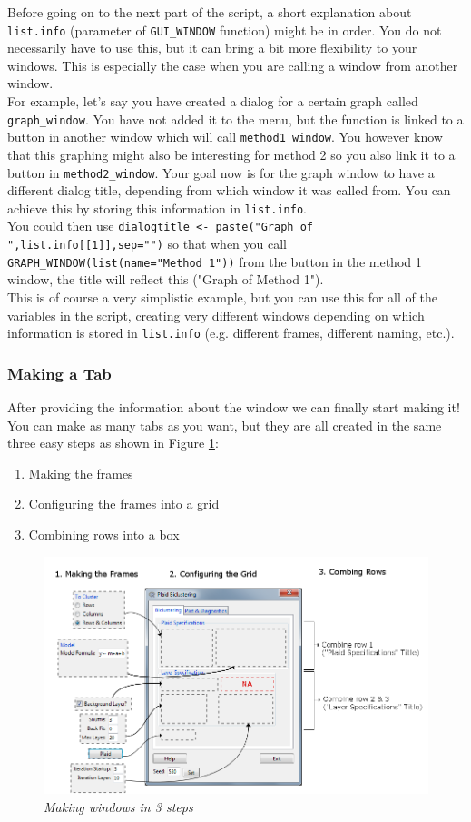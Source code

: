 \documentclass[a4paper]{article}\usepackage[]{graphicx}\usepackage[]{color}
\begin{document}
\noindent Before going on to the next part of the script, a short explanation
about \verb|list.info| (parameter of \verb|GUI_WINDOW| function) might be in
order. You do not necessarily have to use this, but it can bring a bit more
flexibility to your windows. This is especially the case when you are calling
a window from another window.\\
For example, let's say you have created a dialog for a certain graph called
\verb|graph_window|. You have not added it to the menu, but the function is
linked to a button in another window which will call \verb|method1_window|. You
however know that this graphing might also be interesting for method 2 so you
also link it to a button in \verb|method2_window|. Your goal now is for the
graph window to have a different dialog title, depending from which window it
was called from. You can achieve this by storing this information in
\verb|list.info|. \\
You could then use 
\verb|dialogtitle <- paste("Graph of ",list.info[[1]],sep="")| so that when you
call \verb|GRAPH_WINDOW(list(name="Method 1"))| from the button in the method 1
window, the title will reflect this ("Graph of Method 1").\\
This is of course a very simplistic example, but you can use this for all of the
variables in the script, creating very different windows depending on which
information is stored in \verb|list.info| (e.g. different frames, different
naming, etc.).

\subsubsection{Making a Tab}
After providing the information about the window we can finally start making
it! You can make as many tabs as you want, but they are all created in the same
three easy steps as shown in Figure \ref{3steps}:
\begin{enumerate}
\item Making the frames
\item Configuring the frames into a grid
\item Combining rows into a box
\end{enumerate}

\begin{figure}[H]
\centering
\includegraphics[width=\linewidth]{figures/3steps.png}
\caption{{\it Making windows in 3 steps}
\label{3steps}}
\end{figure}
\end{document}
